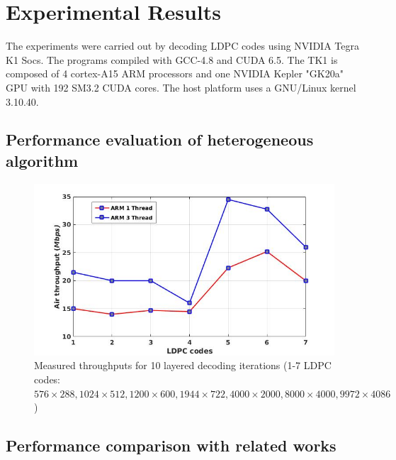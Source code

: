 \documentclass[conference]{IEEEtran}
\begin{document}
\section{Experimental Results} \label{sec4}

The experiments were carried out by decoding LDPC codes using NVIDIA Tegra K1 Socs. The programs compiled with GCC-4.8 and CUDA 6.5. The TK1 is composed of 4 cortex-A15 ARM processors and one NVIDIA Kepler "GK20a" GPU with 192 SM3.2 CUDA cores. The host platform uses a GNU/Linux kernel 3.10.40.

\subsection{Performance evaluation of heterogeneous algorithm} 

\begin{figure}[h]
\begin{centering}
\includegraphics[scale=0.35]{air.jpg}
\caption[width=.5\textwidth]{Measured throughputs for 10 layered decoding iterations (1-7 LDPC codes: $576 \times 288, 1024 \times 512, 1200 \times 600, 1944 \times 722, 4000 \times 2000, 8000 \times 4000, 9972 \times 4086$)}\label{fig::air}
\end{centering}
\end{figure}

\subsection{Performance comparison with related works}
\end{document}

